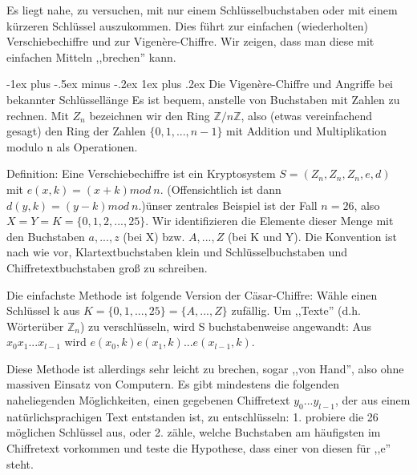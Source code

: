 \documentclass[a4paper]{article}
\makeatletter
\renewcommand{\subsubsection}{\@startsection{subsubsection}{3}{0mm}%
 {-1ex plus -.5ex minus -.2ex}%
 {1ex plus .2ex}%
 {\normalfont\small\bfseries}}
\makeatother
\begin{document}
\begin{multicols}{3}
    Es liegt nahe, zu versuchen, mit nur einem Schlüsselbuchstaben oder mit einem kürzeren Schlüssel auszukommen. Dies führt zur einfachen (wiederholten) Verschiebechiffre und zur Vigenère-Chiffre. Wir zeigen, dass man diese mit einfachen Mitteln ,,brechen'' kann.

    \subsubsection{Die Vigenère-Chiffre und Angriffe bei bekannter Schlüssellänge}
    Es ist bequem, anstelle von Buchstaben mit Zahlen zu rechnen. Mit $Z_n$ bezeichnen wir den Ring $\mathbb{Z}/n\mathbb{Z}$, also (etwas vereinfachend gesagt) den Ring der Zahlen $\{0,1,...,n-1\}$ mit Addition und Multiplikation modulo n als Operationen.

    Definition: Eine Verschiebechiffre ist ein Kryptosystem $S=(Z_n,Z_n,Z_n,e,d)$ mit $e(x,k)=(x+k) mod\ n$. (Offensichtlich ist dann $d(y,k)=(y-k)mod\ n$.)ünser zentrales Beispiel ist der Fall $n=26$, also $X=Y=K=\{0,1,2,...,25\}$. Wir identifizieren die Elemente dieser Menge mit den Buchstaben $a,...,z$ (bei X) bzw. $A,...,Z$ (bei K und Y). Die Konvention ist nach wie vor, Klartextbuchstaben klein und Schlüsselbuchstaben und Chiffretextbuchstaben groß zu schreiben.

    Die einfachste Methode ist folgende Version der Cäsar-Chiffre: Wähle einen Schlüssel k aus $K=\{0,1,...,25\}=\{A,...,Z\}$ zufällig. Um ,,Texte'' (d.h. Wörterüber $\mathbb{Z}_n$) zu verschlüsseln, wird S buchstabenweise angewandt: Aus $x_0 x_1...x_{l-1}$ wird $e(x_0,k)e(x_1,k)...e(x_{l-1},k)$.

    Diese Methode ist allerdings sehr leicht zu brechen, sogar ,,von Hand'', also ohne massiven Einsatz von Computern. Es gibt mindestens die folgenden naheliegenden Möglichkeiten, einen gegebenen Chiffretext $y_0...y_{l-1}$, der aus einem natürlichsprachigen Text entstanden ist, zu entschlüsseln:
    1. probiere die 26 möglichen Schlüssel aus, oder
    2. zähle, welche Buchstaben am häufigsten im Chiffretext vorkommen und teste die Hypothese, dass einer von diesen für ,,e'' steht.


\end{multicols}
\end{document}
